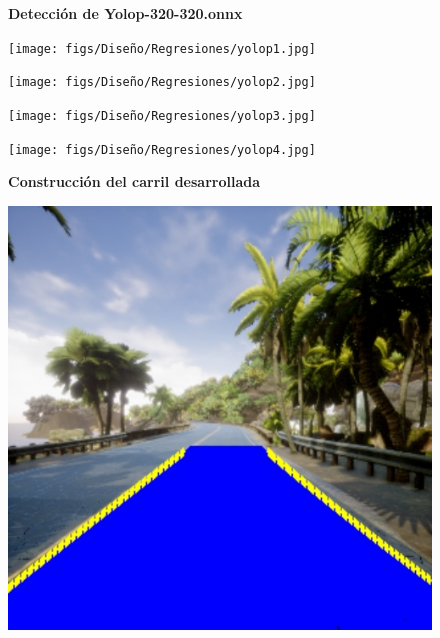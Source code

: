 \begin{figure}[H]
  \centering

  \textbf{Detección de Yolop-320-320.onnx}
  \vspace{0.5cm}

  \begin{minipage}[t]{0.2\textwidth}
      \centering
      \texttt{[image: figs/Diseño/Regresiones/yolop1.jpg]}
      \caption*{}
  \end{minipage}
  \hfill
  \begin{minipage}[t]{0.2\textwidth}
      \centering
      \texttt{[image: figs/Diseño/Regresiones/yolop2.jpg]}
      \caption*{}
  \end{minipage}
  \hfill
  \begin{minipage}[t]{0.2\textwidth}
      \centering
      \texttt{[image: figs/Diseño/Regresiones/yolop3.jpg]}
      \caption*{}
  \end{minipage}
  \hfill
  \begin{minipage}[t]{0.2\textwidth}
      \centering
      \texttt{[image: figs/Diseño/Regresiones/yolop4.jpg]}
      \caption*{}
  \end{minipage}

  \vspace{0.5cm}

  \textbf{Construcción del carril desarrollada}
  \vspace{0.5cm}

  \begin{minipage}[t]{0.2\textwidth}
      \centering
      \includegraphics[width=\textwidth]{figs/Diseño/Regresiones/interpolación1.jpg}


\end{minipage}
\end{figure}
